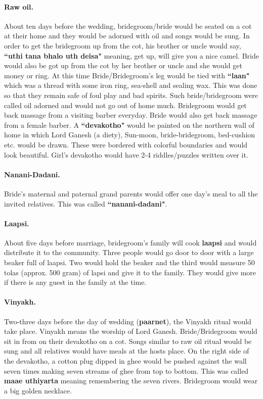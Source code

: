 \paragraph{Raw oil.} About ten days before the wedding, bridegroom/bride would be
seated on a cot at their home and they would be adorned with oil and songs
would be sung. In order to get the bridegroom up from the cot, his brother or uncle
would say, \textbf{``uthi tana bhalo uth deisa"} meaning, get up, will give you
a nice camel. Bride would also be got up from the cot by her brother or uncle
and she would get money or ring. At this time Bride/Bridegroom's leg would be tied
with \textbf{``laan"} which was a thread with some iron ring, sea-shell and
sealing wax. This was done so that they remain safe of foul play and bad
spirits. Such bride/bridegroom were called oil adorned and would not go out of home
much. Bridegroom would get back massage from a visiting barber everyday. Bride would
also get back massage from a female barber. A \textbf{``devakotho"} would be
painted on the northern wall of home in which Lord Ganesh (a diety), Sun-moon,
bride-bridegroom, bed-cushion etc. would be drawn. These were bordered with colorful
boundaries and would look beautiful. Girl's devakotho would have 2-4
riddles/puzzles written over it.

\paragraph{Nanani-Dadani.} Bride's maternal and paternal grand parents would
offer one day's meal to all the invited relatives. This was called
\textbf{``nanani-dadani"}.

\paragraph{Laapsi.} About five days before marriage, bridegroom's family will cook
\textbf{laapsi} and would distribute it to the community. Three people would go
door to door with a large beaker full of laapsi. Two would hold the beaker and
the third would measure 50 tolas (approx. 500 gram) of lapsi and give it to the
family. They would give more if there is any guest in the family at the time.

\paragraph{Vinyakh.} Two-three days before the day of wedding (\textbf{paarnet}),
the Vinyakh ritual would take place. Vinyakh means the worship of Lord Ganesh.
Bride/Bridegroom would sit in from on their devakotho on a cot. Songs similar to raw
oil ritual would be sung and all relatives would have meals at the hosts place.
On the right side of the devakotho, a cotton plug dipped in ghee would be
pushed against the wall seven times making seven streams of ghee from top to
bottom. This was called \textbf{maae uthiyarta} meaning remembering the seven
rivers. Bridegroom would wear a big golden necklace.  

